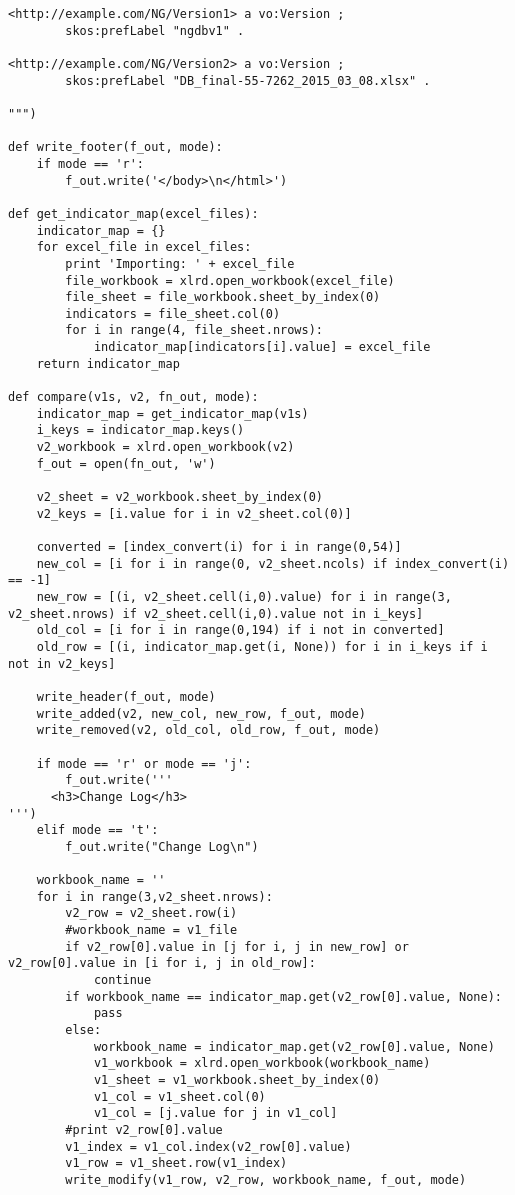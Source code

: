 \begin{verbatim}
<http://example.com/NG/Version1> a vo:Version ;
        skos:prefLabel "ngdbv1" .

<http://example.com/NG/Version2> a vo:Version ;
        skos:prefLabel "DB_final-55-7262_2015_03_08.xlsx" .

""")

def write_footer(f_out, mode):
	if mode == 'r':
		f_out.write('</body>\n</html>')

def get_indicator_map(excel_files):
	indicator_map = {}
	for excel_file in excel_files:
		print 'Importing: ' + excel_file
		file_workbook = xlrd.open_workbook(excel_file)
		file_sheet = file_workbook.sheet_by_index(0)
		indicators = file_sheet.col(0)
		for i in range(4, file_sheet.nrows):
			indicator_map[indicators[i].value] = excel_file
	return indicator_map

def compare(v1s, v2, fn_out, mode):
	indicator_map = get_indicator_map(v1s)
	i_keys = indicator_map.keys()
	v2_workbook = xlrd.open_workbook(v2)
	f_out = open(fn_out, 'w')

	v2_sheet = v2_workbook.sheet_by_index(0)
	v2_keys = [i.value for i in v2_sheet.col(0)]

	converted = [index_convert(i) for i in range(0,54)]
	new_col = [i for i in range(0, v2_sheet.ncols) if index_convert(i) == -1]
	new_row = [(i, v2_sheet.cell(i,0).value) for i in range(3, v2_sheet.nrows) if v2_sheet.cell(i,0).value not in i_keys]
	old_col = [i for i in range(0,194) if i not in converted]
	old_row = [(i, indicator_map.get(i, None)) for i in i_keys if i not in v2_keys]

	write_header(f_out, mode)
	write_added(v2, new_col, new_row, f_out, mode)
	write_removed(v2, old_col, old_row, f_out, mode)

	if mode == 'r' or mode == 'j':
		f_out.write('''
      <h3>Change Log</h3>
''')
	elif mode == 't':
		f_out.write("Change Log\n")

	workbook_name = ''
	for i in range(3,v2_sheet.nrows):
		v2_row = v2_sheet.row(i)
		#workbook_name = v1_file
		if v2_row[0].value in [j for i, j in new_row] or v2_row[0].value in [i for i, j in old_row]:
			continue
		if workbook_name == indicator_map.get(v2_row[0].value, None):
			pass
		else:
			workbook_name = indicator_map.get(v2_row[0].value, None)
			v1_workbook = xlrd.open_workbook(workbook_name)
			v1_sheet = v1_workbook.sheet_by_index(0)
			v1_col = v1_sheet.col(0)
			v1_col = [j.value for j in v1_col]
		#print v2_row[0].value
		v1_index = v1_col.index(v2_row[0].value)
		v1_row = v1_sheet.row(v1_index)
		write_modify(v1_row, v2_row, workbook_name, f_out, mode)
	

\end{verbatim}
